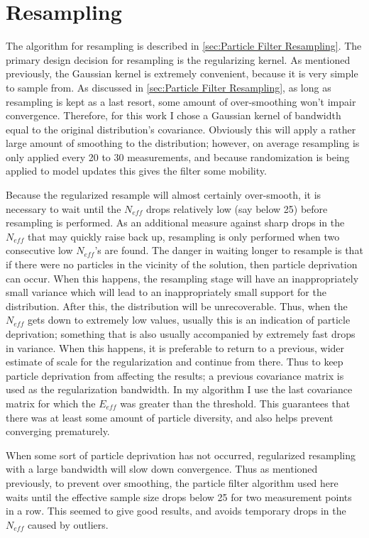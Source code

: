 \section{Resampling}
\label{sec:Resampling}
The algorithm for resampling is described in \autoref{sec:Particle Filter Resampling}.
The primary design decision for resampling is the regularizing
kernel. As mentioned previously, the Gaussian kernel is extremely convenient,
because it is very simple to sample from. As discussed in \autoref{sec:Particle Filter Resampling},
as long as resampling is kept as a last resort, some amount of over-smoothing
won't impair convergence. Therefore, for this work I chose a Gaussian kernel of
bandwidth equal to the original distribution's covariance. Obviously this will
apply a rather large amount of smoothing to the distribution; however, on average
resampling is only applied every 20 to 30 measurements, and because randomization
is being applied to model updates this gives the filter some mobility. 

Because the regularized resample will almost certainly over-smooth,
it is necessary to wait until the $N_{eff}$ drops relatively low
(say below 25) before resampling is performed. As an additional 
measure against sharp drops in the $N_{eff}$ that may quickly raise
back up, resampling is only performed when two consecutive low
$N_{eff}$'s are found. 
The danger in waiting longer to resample is that if there were no
particles in the vicinity of the solution, then particle deprivation
can occur.  When this happens, the resampling
stage will have an inappropriately small variance which will lead to an 
inappropriately small support for the distribution. After this, the 
distribution will be unrecoverable. Thus, when the $N_{eff}$ gets down
to extremely low values, usually this is an indication of particle
deprivation; something that is also usually accompanied by extremely
fast drops in variance. When this happens, it is preferable 
to return to a previous, wider estimate of scale for the regularization
and continue from there. Thus to keep particle deprivation from 
affecting the results; a previous covariance matrix is 
used as the regularization bandwidth. In my algorithm I use
the last covariance matrix for which the $E_{eff}$ was greater than
the threshold. This guarantees that there was at least some amount of 
particle diversity, and also helps prevent converging prematurely.

When some sort of particle deprivation has not occurred, regularized
resampling with a large bandwidth will slow down convergence. Thus
as mentioned previously, to prevent over smoothing, the particle
filter algorithm used here waits until 
the effective sample size drops below 25 for two measurement points
in a row. This seemed to give good results, and avoids
temporary drops in the $N_{eff}$ caused by outliers. 

